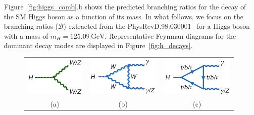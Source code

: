 Figure~\ref{fig:higgs_comb}.b shows the predicted branching ratios for the decay of the SM Higgs boson as a function of its mass. In what follows, we focus on the branching ratios (\(\mathcal{B}\)) extracted from the PhysRevD.98.030001~\cite{PhysRevD.98.030001} for a Higgs boson with a mass of \(m_H = 125.09~\mathrm{GeV}\). Representative Feynman diagrams for the dominant decay modes are displayed in Figure~\ref{fig:h_decays}.

\begin{figure}[htbp]
    \centering
    \begin{tabular}{ccc}
        \includegraphics[width=0.3\linewidth]{images/HVV.png}  &
        \includegraphics[width=0.3\linewidth]{images/Hgg.png}  &
        \includegraphics[width=0.3\linewidth]{images/Hgg_loop.png}   \\
        (a) & (b) & (c) \\
    \end{tabular}
    \vspace{0.5em} %
\end{figure}
